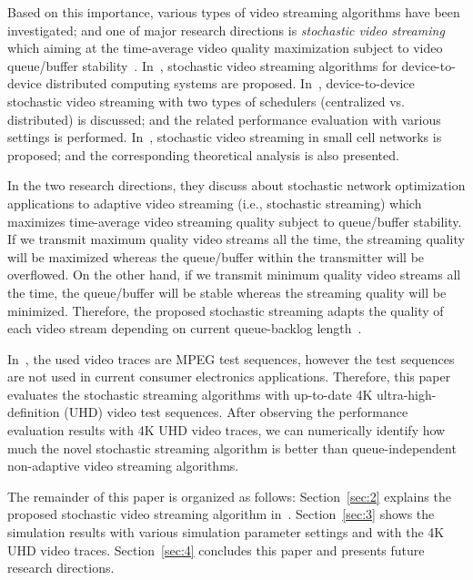 \documentclass[conference]{IEEEtran}
\begin{document}
Based on this importance, various types of video streaming algorithms have been investigated; and one of major research directions is \textit{stochastic video streaming}
    which aiming at the time-average video quality maximization subject to video queue/buffer stability~\cite{ton2015kim,arxiv2014kim,mobicom2013kim,asilomar2012bethanabhotla,tcomm2014bethanabhotla,isit2013bethanabhotla}.
In~\cite{ton2015kim,arxiv2014kim,mobicom2013kim}, stochastic video streaming algorithms for device-to-device distributed computing systems are proposed.
In~\cite{ton2015kim}, device-to-device stochastic video streaming with two types of schedulers (centralized vs. distributed) is discussed; and the related performance evaluation with various settings is performed.
In~\cite{asilomar2012bethanabhotla,tcomm2014bethanabhotla,isit2013bethanabhotla}, stochastic video streaming in small cell networks is proposed; and the corresponding theoretical analysis is also presented.

In the two research directions, they discuss about stochastic network optimization applications to adaptive video streaming (i.e., stochastic streaming) which maximizes time-average video streaming quality subject to queue/buffer stability.
If we transmit maximum quality video streams all the time, the streaming quality will be maximized whereas the queue/buffer within the transmitter will be overflowed.
On the other hand, if we transmit minimum quality video streams all the time, the queue/buffer will be stable whereas the streaming quality will be minimized.
Therefore, the proposed stochastic streaming adapts the quality of each video stream depending on current queue-backlog length~\cite{ton2015kim,arxiv2014kim,mobicom2013kim,asilomar2012bethanabhotla,tcomm2014bethanabhotla,isit2013bethanabhotla}.

In~\cite{ton2015kim,arxiv2014kim,mobicom2013kim,asilomar2012bethanabhotla,tcomm2014bethanabhotla,isit2013bethanabhotla},
the used video traces are MPEG test sequences, however the test sequences are not used in current consumer electronics applications.
Therefore, this paper evaluates the stochastic streaming algorithms with up-to-date 4K ultra-high-definition (UHD) video test sequences.
After observing the performance evaluation results with 4K UHD video traces, we can numerically identify how much the novel stochastic streaming algorithm is better than queue-independent non-adaptive video streaming algorithms.

The remainder of this paper is organized as follows:
Section~\ref{sec:2} explains the proposed stochastic video streaming algorithm in~\cite{ton2015kim,arxiv2014kim}.
Section~\ref{sec:3} shows the simulation results with various simulation parameter settings and with the 4K UHD video traces.
Section~\ref{sec:4} concludes this paper and presents future research directions.
\end{document}
